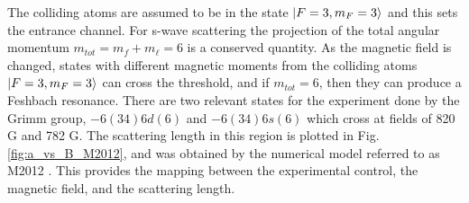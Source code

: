 \documentclass[prl,onecolumn,amsmath,amssymb,titlepage,nofootinbib,preprint]{revtex4-1}
\begin{document}
The colliding atoms are assumed to be in the state $\ket{F=3,m_{F}=3}$ and this sets the entrance channel.  For s-wave scattering the projection of the total angular momentum $m_{tot}=m_{f}+m_{\ell}=6$ is a conserved quantity.  As the magnetic field is changed, states with different magnetic moments from the colliding atoms $\ket{F=3,m_{F}=3}$ can cross the threshold, and if $m_{tot}=6$, then they can produce a Feshbach resonance.  There are two relevant states for the experiment done by the Grimm group, $-6(34)6d(6)$ and $-6(34)6s(6)$ which cross at fields of 820 G and 782 G.  The scattering length in this region is plotted in Fig. \ref{fig:a_vs_B_M2012}, and was obtained by the numerical model referred to as M2012 \cite{Berninger2013}.  This provides the mapping between the experimental control, the magnetic field, and the scattering length.  
\end{document}
